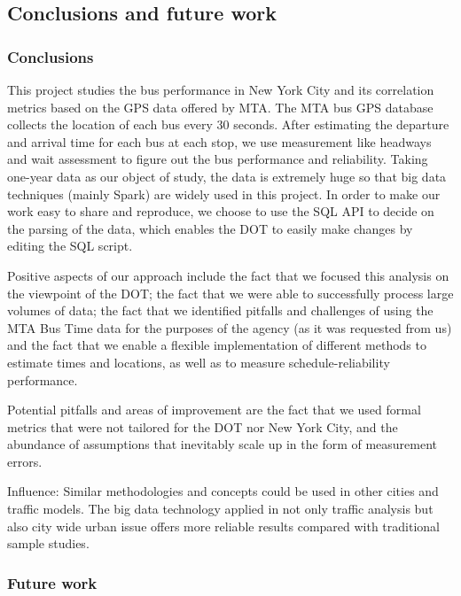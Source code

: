 \documentclass[12pt]{report}
\begin{document}
\subsection{Conclusions and future work}

\subsubsection*{Conclusions}


This project studies the bus performance in New York City and its correlation metrics based on the GPS data offered by MTA. The MTA bus GPS database collects the location of each bus every 30 seconds. After estimating the departure and arrival time for each bus at each stop, we use measurement like headways and wait assessment to figure out the bus performance and reliability. Taking one-year data as our object of study, the data is extremely huge so that big data techniques (mainly Spark) are widely used in this project. In order to make our work easy to share and reproduce, we choose to use the SQL API to decide on the parsing of the data, which enables the DOT to easily make changes by editing the SQL script. 

Positive aspects of our approach include the fact that we focused this analysis on the viewpoint of the DOT; the fact that we were able to successfully process large volumes of data; the fact that we identified pitfalls and challenges of using the MTA Bus Time data for the purposes of the agency (as it was requested from us) and the fact that we enable a flexible implementation of different methods to estimate times and locations, as well as to measure schedule-reliability performance.

Potential pitfalls and areas of improvement are the fact that we used formal metrics that were not tailored for the DOT nor New York City, and the abundance of assumptions that inevitably scale up in the form of measurement errors.

Influence: Similar methodologies and concepts could be used in other cities and traffic models. The big data technology applied in not only traffic analysis but also city wide urban issue offers more reliable results compared with traditional sample studies.  


\subsubsection*{Future work}
\end{document}
